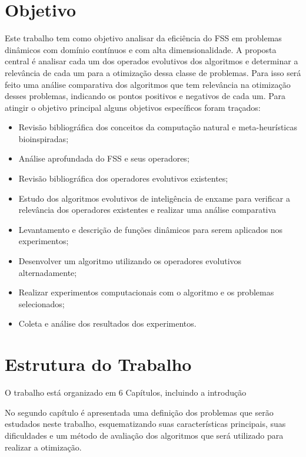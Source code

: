 \section{Objetivo}
\label{sec:objetivo}
Este trabalho tem como objetivo analisar da eficiência do FSS em problemas dinâmicos com domínio contínuos e com alta dimensionalidade. A proposta central é analisar cada um dos operados evolutivos dos algoritmos e determinar a relevância de cada um para a otimização dessa classe de problemas. Para isso será feito uma análise comparativa dos algoritmos que tem relevância na otimização desses problemas, indicando os pontos positivos e negativos de cada um. Para atingir o objetivo principal alguns objetivos específicos foram traçados:

\begin{itemize}
\item Revisão bibliográfica dos conceitos da computação natural e meta-heurísticas bioinspiradas;
\item Análise aprofundada do FSS e seus operadores;
\item Revisão bibliográfica dos operadores evolutivos existentes;
\item Estudo dos algoritmos evolutivos de inteligência de enxame para verificar a relevância dos operadores existentes e realizar uma análise comparativa
\item Levantamento e descrição de funções dinâmicos para serem aplicados nos experimentos;
\item Desenvolver um algoritmo utilizando os operadores evolutivos alternadamente;
\item Realizar experimentos computacionais com o algoritmo e os problemas selecionados;
\item Coleta e análise dos resultados dos experimentos.
\end{itemize} 

\section{Estrutura do Trabalho}
\label{sec:escopo}

O trabalho está organizado em 6 Capítulos, incluindo a introdução

No segundo capítulo é apresentada uma definição dos problemas que serão estudados neste trabalho, esquematizando suas características principais, suas dificuldades e um método de avaliação dos algoritmos que será utilizado para realizar a otimização.

